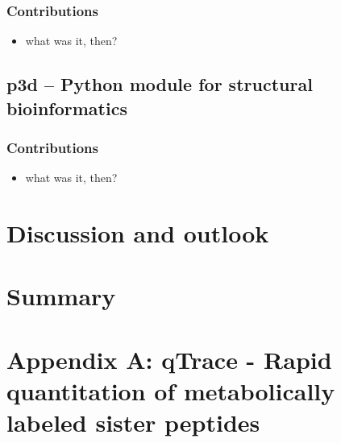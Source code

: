 \documentclass[11pt,a4paper,twoside]{report}
\newcommand{\includepublication}[1]{}
\begin{document}
\subsection*{Contributions}

\begin{itemize}
\item what was it, then?
\end{itemize}


\cleardoublepage
\section{p3d -- Python module for structural bioinformatics}

\subsection*{Contributions}

\begin{itemize}
\item what was it, then?
\end{itemize}

\includepublication{publications/fufezan-2009.pdf}

\chapter{Discussion and outlook}

\chapter{Summary}

\chapter*{Appendix A: qTrace - Rapid quantitation of metabolically labeled sister peptides}
\end{document}
